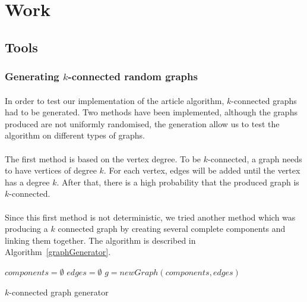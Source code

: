 \section{Work}

\subsection{Tools}
\subsubsection{Generating $k$-connected random graphs}
\paragraph{}
In order to test our implementation of the article algorithm, $k$-connected 
graphs had to be generated. Two methods have been implemented, although the
graphs produced are not uniformly randomised, the generation allow us to test
the algorithm on different types of graphs.

\paragraph{}
The first method is based on the vertex degree. To be $k$-connected, a graph
needs to have vertices of degree $k$. For each vertex, edges will be added
until the vertex has a degree $k$. After that, there is a high probability
that the produced graph is $k$-connected.

\paragraph{}
Since this first method is not deterministic, we tried another method which was
producing a $k$ connected graph by creating several complete components and
linking them together. The algorithm is described in
Algorithm~\ref{graphGenerator}.

\begin{algorithm}[!h]
  $components = \emptyset$\;
  $edges = \emptyset$\;
  $g = newGraph(components, edges)$\;
  \;
  \caption{\label{graphGenerator}$k$-connected graph generator}
\end{algorithm}

